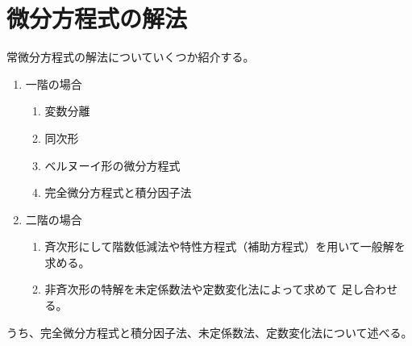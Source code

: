 \newpage
\section{微分方程式の解法}
常微分方程式の解法についていくつか紹介する。
\begin{enumerate}[label=\arabic*.]
  \item 一階の場合
  \begin{enumerate}[label=\roman*.]
    \item 変数分離
    \item 同次形
    \item ベルヌーイ形の微分方程式
    \item 完全微分方程式と積分因子法
  \end{enumerate}
  \item 二階の場合
  \begin{enumerate}[label=\roman*.]
    \item 斉次形にして階数低減法や特性方程式（補助方程式）を用いて一般解を求める。
    \item 非斉次形の特解を未定係数法や定数変化法によって求めて
    足し合わせる。
  \end{enumerate}
\end{enumerate}

うち、完全微分方程式と積分因子法、未定係数法、定数変化法について述べる。
